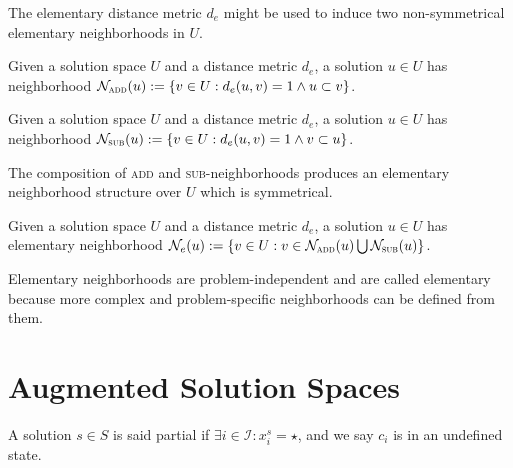 \documentclass[12pt]{llncs}
\begin{document}
The elementary distance metric $d_e$ might be used to induce two non-symmetrical elementary neighborhoods in $U$. 

\begin{definition}
Given a solution space $U$ and a distance metric $d_e$, a solution $u\in U$ has neighborhood $\mathcal{N}_\text{\sc{add}}(u) :=\{v\in U : d_e(u,v) = 1 \land u\subset v\}$.
\end{definition}

\begin{definition}
Given a solution space $U$ and a distance metric $d_e$, a solution $u\in U$ has neighborhood $\mathcal{N}_\text{\sc{sub}}(u) :=\{v\in U : d_e(u,v) = 1 \land v\subset u\}$.
\end{definition}

The composition of \textsc{add} and \textsc{sub}-neighborhoods produces an elementary neighborhood structure over $U$ which is symmetrical.
\begin{definition}
Given a solution space $U$ and a distance metric $d_e$, a solution $u\in U$ has elementary neighborhood $\mathcal{N}_e(u) :=\{v\in U : v\in \mathcal{N}_\text{\sc{add}}(u) \bigcup \mathcal{N}_\text{\sc{sub}}(u) \}$.
\end{definition}

Elementary neighborhoods are problem-independent and are called elementary because more complex and problem-specific neighborhoods can be defined from them. 

\section{Augmented Solution Spaces}


\begin{definition}
A solution $s\in S$ is said partial if $\exists i\in \mathcal{I} : x^{s}_i = \star$, and we say $c_i$ is in an {undefined state}. 
\end{definition}
\end{document}
